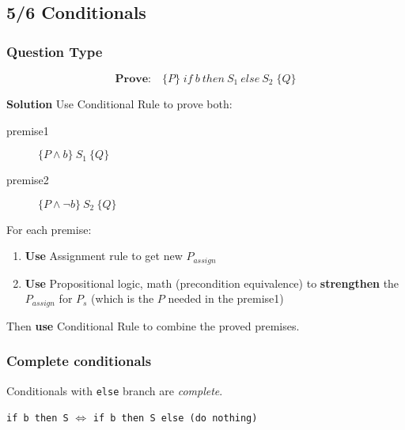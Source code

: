 \subsection*{5/6 Conditionals}
\subsubsection*{Question Type}
{
  \setlength{\abovedisplayskip}{0pt}
  \setlength{\belowdisplayskip}{3pt}
  \setlength{\abovedisplayshortskip}{0pt}
  \setlength{\belowdisplayshortskip}{3pt}

\[\textbf{Prove:}\quad \{P\}\;if\:b\:then\:S_{1}\:else\:S_{2}\;\{Q\}\]
}
\textbf{Solution} Use Conditional Rule to prove both:
\begin{description}
\item [premise1] \(\{P \land b\}\:S_{1}\:\{Q\}\)
\item [premise2] \(\{P \land \neg b\}\:S_{2}\:\{Q\}\)
\end{description}
For each premise:
\begin{enumerate}
\item\label{step1} \textbf{Use} Assignment rule to get new \(P_{assign}\)
\item\label{step2} \textbf{Use} Propositional logic, math (precondition equivalence) to \textbf{strengthen} the \(P_{assign}\) for \(P_{s}\) (which is the \(P\) needed in the premise1)
\end{enumerate}
Then \textbf{use} Conditional Rule to combine the proved premises.

\subsubsection*{Complete conditionals}
Conditionals with \texttt{else} branch are \emph{complete}.

\texttt{if b then S} $\Longleftrightarrow$ \texttt{if b then S else (do nothing)}

